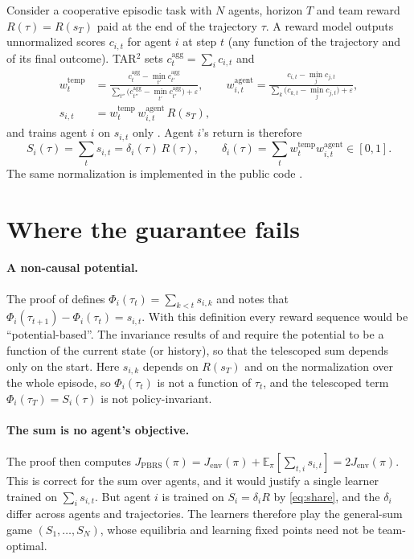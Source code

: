 \documentclass[11pt]{article}
\theoremstyle{remark}
\newcommand{\E}{\mathbb{E}}
\begin{document}
Consider a cooperative episodic task with $N$ agents, horizon $T$ and team reward $R(\tau)=R(s_T)$ paid at the end of the trajectory $\tau$. A reward model outputs unnormalized scores $c_{i,t}$ for agent $i$ at step $t$ (any function of the trajectory and of its final outcome). TAR$^2$ \citep[Eqs.~1--3]{kapoor2025tar2} sets $c^{\mathrm{agg}}_t=\sum_ic_{i,t}$ and
\begin{align}
w^{\mathrm{temp}}_t&=\frac{c^{\mathrm{agg}}_t-\min_{t'}c^{\mathrm{agg}}_{t'}}{\sum_{t''}\big(c^{\mathrm{agg}}_{t''}-\min_{t'}c^{\mathrm{agg}}_{t'}\big)+\varepsilon},\qquad
w^{\mathrm{agent}}_{i,t}=\frac{c_{i,t}-\min_jc_{j,t}}{\sum_k\big(c_{k,t}-\min_jc_{j,t}\big)+\varepsilon},\label{eq:w}\\
s_{i,t}&=w^{\mathrm{temp}}_t\,w^{\mathrm{agent}}_{i,t}\,R(s_T),\label{eq:s}
\end{align}
and trains agent $i$ on $s_{i,t}$ only \citep[Sec.~3.2]{kapoor2025tar2}. Agent $i$'s return is therefore
\begin{equation}
S_i(\tau)=\sum_ts_{i,t}=\delta_i(\tau)\,R(\tau),\qquad \delta_i(\tau)=\sum_tw^{\mathrm{temp}}_tw^{\mathrm{agent}}_{i,t}\in[0,1].\label{eq:share}
\end{equation}
The same normalization is implemented in the public code \citep[\texttt{MAPPO/agent.py}, branch \texttt{TAR\^{}2\_v2}]{kapoor2024code}.

\section{Where the guarantee fails}\label{sec:gap}

\paragraph{A non-causal potential.} The proof of \citet[Prop.~3.1]{kapoor2025tar2} defines $\Phi_i(\tau_t)=\sum_{k<t}s_{i,k}$ and notes that $\Phi_i(\tau_{t+1})-\Phi_i(\tau_t)=s_{i,t}$. With this definition every reward sequence would be ``potential-based''. The invariance results of \citet{ng1999policy} and \citet{devlin2011pbrs} require the potential to be a function of the current state (or history), so that the telescoped sum depends only on the start. Here $s_{i,k}$ depends on $R(s_T)$ and on the normalization over the whole episode, so $\Phi_i(\tau_t)$ is not a function of $\tau_t$, and the telescoped term $\Phi_i(\tau_T)=S_i(\tau)$ is not policy-invariant.

\paragraph{The sum is no agent's objective.} The proof then computes $J_{\mathrm{PBRS}}(\pi)=J_{\mathrm{env}}(\pi)+\E_\pi[\sum_{t,i}s_{i,t}]=2J_{\mathrm{env}}(\pi)$. This is correct for the sum over agents, and it would justify a single learner trained on $\sum_is_{i,t}$. But agent $i$ is trained on $S_i=\delta_iR$ by \eqref{eq:share}, and the $\delta_i$ differ across agents and trajectories. The learners therefore play the general-sum game $(S_1,\dots,S_N)$, whose equilibria and learning fixed points need not be team-optimal.
\end{document}
